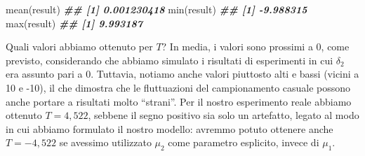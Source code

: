 \documentclass[
  12pt,
]{book}
\newenvironment{Shaded}{\begin{snugshade}}{\end{snugshade}}
\newcommand{\CommentTok}[1]{\textcolor[rgb]{0.56,0.35,0.01}{\textit{#1}}}
\newcommand{\ConstantTok}[1]{\textcolor[rgb]{0.00,0.00,0.00}{#1}}
\newcommand{\ControlFlowTok}[1]{\textcolor[rgb]{0.13,0.29,0.53}{\textbf{#1}}}
\newcommand{\DecValTok}[1]{\textcolor[rgb]{0.00,0.00,0.81}{#1}}
\newcommand{\DocumentationTok}[1]{\textcolor[rgb]{0.56,0.35,0.01}{\textbf{\textit{#1}}}}
\newcommand{\FunctionTok}[1]{\textcolor[rgb]{0.00,0.00,0.00}{#1}}
\newcommand{\NormalTok}[1]{#1}
\newcommand{\OtherTok}[1]{\textcolor[rgb]{0.56,0.35,0.01}{#1}}
\newcommand{\SpecialCharTok}[1]{\textcolor[rgb]{0.00,0.00,0.00}{#1}}
\begin{document}
\begin{Shaded}
\end{Shaded}

\begin{Shaded}
\begin{Highlighting}[]
\FunctionTok{mean}\NormalTok{(result) }
\DocumentationTok{\#\# [1] 0.001230418}
\FunctionTok{min}\NormalTok{(result)}
\DocumentationTok{\#\# [1] {-}9.988315}
\FunctionTok{max}\NormalTok{(result)}
\DocumentationTok{\#\# [1] 9.993187}
\end{Highlighting}
\end{Shaded}

Quali valori abbiamo ottenuto per \(T\)? In media, i valori sono prossimi a 0, come previsto, considerando che abbiamo simulato i risultati di esperimenti in cui \(\delta_2\) era assunto pari a 0. Tuttavia, notiamo anche valori piuttosto alti e bassi (vicini a 10 e -10), il che dimostra che le fluttuazioni del campionamento casuale possono anche portare a risultati molto ``strani''. Per il nostro esperimento reale abbiamo ottenuto \(T = 4,522\), sebbene il segno positivo sia solo un artefatto, legato al modo in cui abbiamo formulato il nostro modello: avremmo potuto ottenere anche \(T = -4,522\) se avessimo utilizzato \(\mu_2\) come parametro esplicito, invece di \(\mu_1\).
\end{document}
